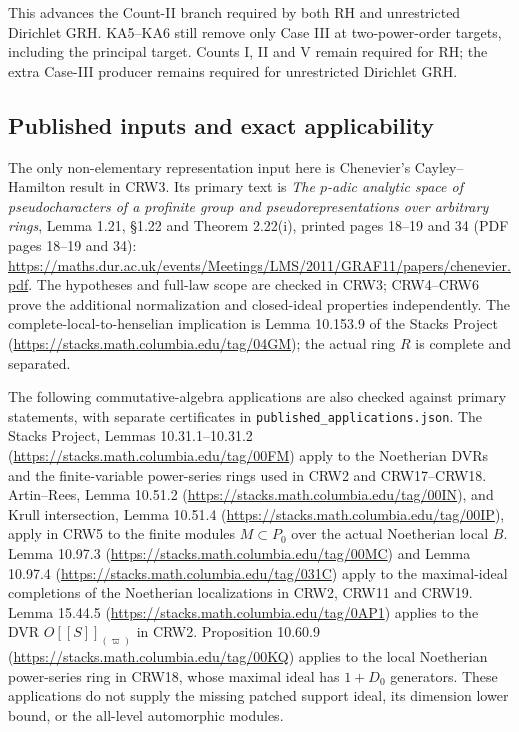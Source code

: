 This advances the Count-II branch required by both
RH and unrestricted Dirichlet GRH.  KA5--KA6 still
remove only Case III at two-power-order targets,
including the principal target.  Counts I, II and V
remain required for RH; the extra Case-III producer
remains required for unrestricted Dirichlet GRH.

\subsection{Published inputs and exact applicability}

The only non-elementary representation input here is
Chenevier's Cayley--Hamilton result in CRW3.  Its
primary text is \emph{The $p$-adic analytic space of
pseudocharacters of a profinite group and
pseudorepresentations over arbitrary rings},
Lemma 1.21, \S1.22 and Theorem 2.22(i), printed
pages 18--19 and 34 (PDF pages 18--19 and 34):
\url{https://maths.dur.ac.uk/events/Meetings/LMS/2011/GRAF11/papers/chenevier.pdf}.
The hypotheses and full-law scope are checked in CRW3;
CRW4--CRW6 prove the additional normalization and
closed-ideal properties independently.
The complete-local-to-henselian implication is
Lemma 10.153.9 of the Stacks Project
(\url{https://stacks.math.columbia.edu/tag/04GM});
the actual ring $R$ is complete and separated.

The following commutative-algebra applications are also
checked against primary statements, with separate
certificates in \texttt{published\_applications.json}.
The Stacks Project, Lemmas 10.31.1--10.31.2
(\url{https://stacks.math.columbia.edu/tag/00FM})
apply to the Noetherian DVRs and the finite-variable
power-series rings used in CRW2 and CRW17--CRW18.
Artin--Rees, Lemma 10.51.2
(\url{https://stacks.math.columbia.edu/tag/00IN}),
and Krull intersection, Lemma 10.51.4
(\url{https://stacks.math.columbia.edu/tag/00IP}),
apply in CRW5 to the finite modules $M\subset P_0$
over the actual Noetherian local $B$.
Lemma 10.97.3
(\url{https://stacks.math.columbia.edu/tag/00MC})
and Lemma 10.97.4
(\url{https://stacks.math.columbia.edu/tag/031C})
apply to the maximal-ideal completions of the
Noetherian localizations in CRW2, CRW11 and CRW19.
Lemma 15.44.5
(\url{https://stacks.math.columbia.edu/tag/0AP1})
applies to the DVR $O[[S]]_{(\varpi)}$ in CRW2.
Proposition 10.60.9
(\url{https://stacks.math.columbia.edu/tag/00KQ})
applies to the local Noetherian power-series ring
in CRW18, whose maximal ideal has $1+D_0$ generators.
These applications do not supply the missing patched
support ideal, its dimension lower bound, or the
all-level automorphic modules.

